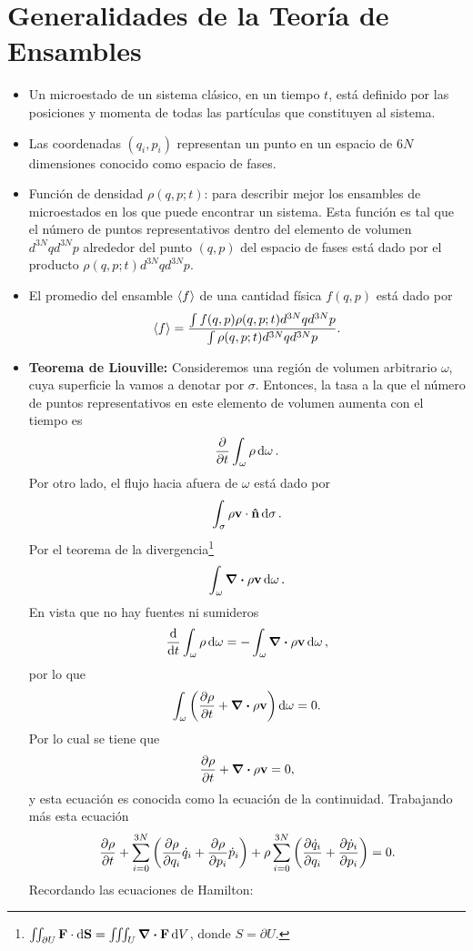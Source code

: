 \section{Generalidades de la Teoría de Ensambles}
\begin{itemize}
    \item Un microestado de un sistema clásico, en un tiempo $t$, está definido por las posiciones y momenta de todas las partículas que constituyen al sistema.
    \item Las coordenadas $(q_i ,p_i)$ representan un punto en un espacio de $6N$ dimensiones conocido como espacio de fases.
    \item Función de densidad $\rho (q,p;t)$: para describir mejor los ensambles de microestados en los que puede encontrar un sistema. Esta función es tal que el número de puntos representativos dentro del elemento de volumen $d^{3N} qd^{3N}p$ alrededor del punto $(q,p)$ del espacio de fases está dado por el producto $\rho (q,p;t) d^{3N} qd^{3N}p$.
    \item El promedio del ensamble $\expval{f}$ de una cantidad física $f(q,p)$ está dado por
        $$ \expval{f} = \frac{\int f(q,p) \rho (q,p;t) d^{3N} qd^{3N}p}{\int \rho (q,p;t) d^{3N} qd^{3N}p} . $$
    \item \textbf{Teorema de Liouville:} Consideremos una región de volumen arbitrario $\omega$, cuya superficie la vamos a denotar por $\sigma$. Entonces, la tasa a la que el número de puntos representativos en este elemento de volumen aumenta con el tiempo es
        $$ \pdv{t} \int _\omega \rho \dd{\omega}. $$
    Por otro lado, el flujo hacia afuera de $\omega$ está dado por
        $$ \int _\sigma \rho \vb{v} \cdot \vu{n} \dd{\sigma}. $$
    Por el teorema de la divergencia\footnote{$\iint _{\partial U} \vb{F} \cdot \dd{\vb{S}} = \iiint _U \div{\vb{F}} \dd{V}$, donde $S = \partial U$.}
        $$ \int _\omega \div{\rho \vb{v}} \dd{\omega}. $$
    En vista que no hay fuentes ni sumideros
        $$ \dv{t} \int _\omega \rho \dd{\omega} = -\int _\omega \div{\rho \vb{v}} \dd{\omega}, $$
    por lo que
        $$ \int _\omega \qty(\pdv{\rho}{t} + \div{\rho \vb{v}}) \dd{\omega} = 0. $$
    Por lo cual se tiene que
        $$ \pdv{\rho}{t} + \div{\rho \vb{v}} = 0, $$
    y esta ecuación es conocida como la ecuación de la continuidad. Trabajando más esta ecuación
        $$ \pdv{\rho}{t} + \sum _{i=0} ^{3N} \qty(\pdv{\rho}{q_i} \dot{q}_i + \pdv{\rho}{p_i} \dot{p}_i) + \rho \sum _{i=0} ^{3N} \qty(\pdv{\dot{q}_i}{q_i} + \pdv{\dot{p}_i}{p_i}) = 0. $$
    Recordando las ecuaciones de Hamilton:

\end{itemize}
